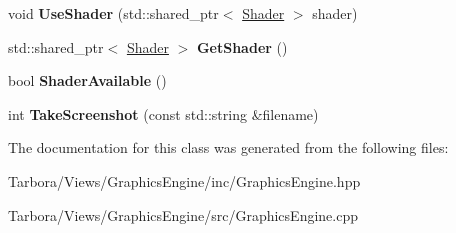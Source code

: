 \begin{DoxyCompactItemize}
void {\bfseries Use\+Shader} (std\+::shared\+\_\+ptr$<$ \hyperlink{classTarbora_1_1Shader}{Shader} $>$ shader)
\item 
\mbox{\label{classTarbora_1_1GraphicsEngineImpl_a58d55fc50cc0ee4441826bea5027becd}} 
std\+::shared\+\_\+ptr$<$ \hyperlink{classTarbora_1_1Shader}{Shader} $>$ {\bfseries Get\+Shader} ()
\item 
\mbox{\label{classTarbora_1_1GraphicsEngineImpl_a0ac12dc1b663d4f5ae5bde9e4b27989f}} 
bool {\bfseries Shader\+Available} ()
\item 
\mbox{\label{classTarbora_1_1GraphicsEngineImpl_a07411627d0080e64e107a4259b82d970}} 
int {\bfseries Take\+Screenshot} (const std\+::string \&filename)
\end{DoxyCompactItemize}


The documentation for this class was generated from the following files\+:\begin{DoxyCompactItemize}
\item 
Tarbora/\+Views/\+Graphics\+Engine/inc/Graphics\+Engine.\+hpp\item 
Tarbora/\+Views/\+Graphics\+Engine/src/Graphics\+Engine.\+cpp\end{DoxyCompactItemize}
